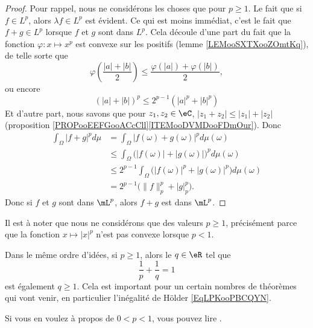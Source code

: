 \begin{proof}
	Pour rappel, nous ne considérons les choses que pour \( p\geq 1\). Le fait que si \( f\in L^p\), alors \( \lambda f\in L^p\) est évident. Ce qui est moins immédiat, c'est le fait que \( f+g\in L^p\) lorsque \( f\) et \( g\) sont dans \( L^p\). Cela découle d'une part du fait que la fonction \( \varphi\colon x\mapsto x^p\) est convexe sur les positifs (lemme \ref{LEMooSXTXooZOmtKq}), de telle sorte que
	\begin{equation}
		\varphi\left( \frac{ |a|+|b| }{2} \right)\leq\frac{ \varphi(|a|)+\varphi(|b|) }{2},
	\end{equation}
	ou encore
	\begin{equation}    \label{EqZFSduFa}
		(|a|+|b|)^p\leq 2^{p-1}(|a|^p+|b|^p)
	\end{equation}
	Et d'autre part, nous savons que pour \( z_1,z_2\in \eC\), \( | z_1+z_2 |\leq | z_1 |+| z_2 |\) (proposition \ref{PROPooEEFGooACcCll}\ref{ITEMooDVMDooFDmOur}). Donc
	\begin{subequations}        \label{EQooKRMEooSLHUUc}
		\begin{align}
			\int_{\Omega}| f+g |^pd\mu & =\int_{\Omega}| f(\omega)+g(\omega) |^pd\mu(\omega)                              \\
			                           & \leq \int_{\Omega}\big( | f(\omega) |+| g(\omega) | \big)^pd\mu(\omega)          \\
			                           & \leq 2^{p-1}\int_{\Omega}\big( | f(\omega) |^p+| g(\omega) |^p \big)d\mu(\omega) \\
			                           & =2^{p-1}\big( \| f \|_p^p+| g |_p^p \big).
		\end{align}
	\end{subequations}
	Donc si \( f\) et \( g\) sont dans \( \mL^p\), alors \( f+g\) est dans \( \mL^p\).
\end{proof}

\begin{normaltext}
	Il est à noter que nous ne considérons que des valeurs \( p\geq 1\), précisément parce que la fonction \( x\mapsto | x |^p\) n'est pas convexe lorsque \( p<1\).

	Dans le même ordre d'idées, si \( p\geq 1\), alors le \( q\in \eR\) tel que
	\begin{equation}
		\frac{1}{ p }+\frac{1}{ q }=1
	\end{equation}
	est également \( q\geq 1\). Cela est important pour un certain nombres de théorèmes qui vont venir, en particulier l'inégalité de Hölder \eqref{EqLPKooPBCQYN}.

	Si vous en voulez à propos de \( 0<p<1\), vous pouvez lire \cite{ooECQXooZUqbSO}.
\end{normaltext}

